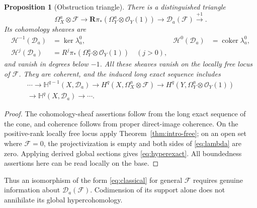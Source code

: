 \documentclass[11pt,reqno]{amsart}
\numberwithin{equation}{section}
\newtheorem{proposition}[theorem]{Proposition}
\theoremstyle{definition}
\theoremstyle{remark}
\newcommand{\OO}{\mathcal O}
\newcommand{\FF}{\mathcal F}
\newcommand{\DD}{\mathcal D}
\newcommand{\RR}{\mathbf R}
\begin{document}
\begin{proposition}[Obstruction triangle]\label{prop:cone}
There is a distinguished triangle
\[
 \Omega_X^a\otimes\FF\longrightarrow
 \RR\pi_*(\Omega_Y^a\otimes\OO_Y(1))\longrightarrow
 \DD_a(\FF)\xrightarrow{+1}.
\]
Its cohomology sheaves are
\begin{align*}
 \mathcal H^{-1}(\DD_a)&=\ker\lambda_a^0,&
 \mathcal H^0(\DD_a)&=\operatorname{coker}\lambda_a^0,\\
 \mathcal H^j(\DD_a)&=R^j\pi_*(\Omega_Y^a\otimes\OO_Y(1))\quad(j>0),
\end{align*}
and vanish in degrees below $-1$. All these sheaves vanish on the locally free locus of $\FF$. They are coherent, and the induced long exact sequence includes
\begin{multline}\label{eq:hyperexact}
 \cdots\to\mathbb H^{q-1}(X,\DD_a)\to
 H^q(X,\Omega_X^a\otimes\FF)\to
 H^q(Y,\Omega_Y^a\otimes\OO_Y(1))\\
 \to\mathbb H^q(X,\DD_a)\to\cdots.
\end{multline}
\end{proposition}
\begin{proof}
The cohomology-sheaf assertions follow from the long exact sequence of the cone, and coherence follows from proper direct-image coherence. On the positive-rank locally free locus apply Theorem~\ref{thm:intro-free}; on an open set where $\FF=0$, the projectivization is empty and both sides of \eqref{eq:lambda} are zero. Applying derived global sections gives \eqref{eq:hyperexact}. All boundedness assertions here can be read locally on the base.
\end{proof}

Thus an isomorphism of the form \eqref{eq:classical} for general $\FF$ requires genuine information about $\DD_a(\FF)$. Codimension of its support alone does not annihilate its global hypercohomology.
\end{document}
